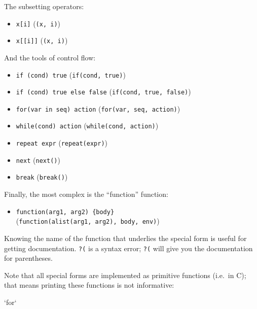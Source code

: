 \documentclass[]{book}
\newenvironment{Shaded}{\begin{snugshade}}{\end{snugshade}}
\newcommand{\DataTypeTok}[1]{\textcolor[rgb]{0.13,0.29,0.53}{#1}}
\newcommand{\StringTok}[1]{\textcolor[rgb]{0.31,0.60,0.02}{#1}}
\providecommand{\tightlist}{%
  \setlength{\itemsep}{0pt}\setlength{\parskip}{0pt}}
\theoremstyle{definition}
\theoremstyle{definition}
\theoremstyle{definition}
\theoremstyle{remark}
\begin{document}
The subsetting operators:

\begin{itemize}
\tightlist
\item
  \texttt{x{[}i{]}}
  (\texttt{\textasciigrave{}{[}\textasciigrave{}(x,\ i)})
\item
  \texttt{x{[}{[}i{]}{]}}
  (\texttt{\textasciigrave{}{[}{[}\textasciigrave{}(x,\ i)})
\end{itemize}

And the tools of control flow:

\begin{itemize}
\tightlist
\item
  \texttt{if\ (cond)\ true}
  (\texttt{\textasciigrave{}if\textasciigrave{}(cond,\ true)})
\item
  \texttt{if\ (cond)\ true\ else\ false}
  (\texttt{\textasciigrave{}if\textasciigrave{}(cond,\ true,\ false)})
\item
  \texttt{for(var\ in\ seq)\ action}
  (\texttt{\textasciigrave{}for\textasciigrave{}(var,\ seq,\ action)})
\item
  \texttt{while(cond)\ action}
  (\texttt{\textasciigrave{}while\textasciigrave{}(cond,\ action)})
\item
  \texttt{repeat\ expr}
  (\texttt{\textasciigrave{}repeat\textasciigrave{}(expr)})
\item
  \texttt{next} (\texttt{\textasciigrave{}next\textasciigrave{}()})
\item
  \texttt{break} (\texttt{\textasciigrave{}break\textasciigrave{}()})
\end{itemize}

Finally, the most complex is the ``function'' function:

\begin{itemize}
\tightlist
\item
  \texttt{function(arg1,\ arg2)\ \{body\}}
  (\texttt{\textasciigrave{}function\textasciigrave{}(alist(arg1,\ arg2),\ body,\ env)})
\end{itemize}

Knowing the name of the function that underlies the special form is
useful for getting documentation. \texttt{?(} is a syntax error;
\texttt{?\textasciigrave{}(\textasciigrave{}} will give you the
documentation for parentheses.

Note that all special forms are implemented as primitive functions
(i.e.~in C); that means printing these functions is not informative:

\begin{Shaded}
\begin{Highlighting}[]
\StringTok{`}\DataTypeTok{for}\StringTok{`}
\end{Highlighting}
\end{Shaded}
\end{document}
